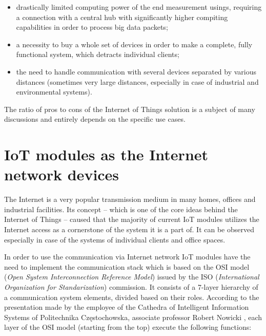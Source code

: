     \begin{itemize}
    	\item [$\bullet$] drastically limited computing power of the end measurement usings, requiring a connection with a central hub with significantly higher compiting capabilities in order to process big data packets;
    	\item [$\bullet$] a necessity to buy a whole set of devices in order to make a complete, fully functional system, which detracts individual clients;
    	\item [$\bullet$] the need to handle communication with several devices separated by various distances (sometimes very large distances, especially in case of industrial and environmental systems). 
    \end{itemize}
    
    The ratio of pros to cons of the Internet of Things solution is a subject of many discussions and entirely depends on the specific use cases.


\section{IoT modules as the Internet network devices}

The Internet is a very popular transmission medium in many homes, offices and industrial facilities. Its concept -- which is one of the core ideas behind the Internet of Things -- caused that the majority of current IoT modules utilizes the Internet access as a cornerstone of the system it is a part of. It can be observed especially in case of the systems of individual clients and office spaces.

In order to use the communication via Internet network IoT modules have the need to implement the communication stack which is based on the OSI model (\emph{Open System Interconnection Reference Model}) issued by the ISO (\emph{International Organization for Standarization}) commission. It consists of a 7-layer hierarchy of a communication system elements, divided based on their roles. According to the presentation made by the employee of the Cathedra of Intelligent Information Systems of Politechnika Częstochowska, associate professor Robert Nowicki \cite{kisi:osi}, each layer of the OSI model (starting from the top) execute the following functions:


